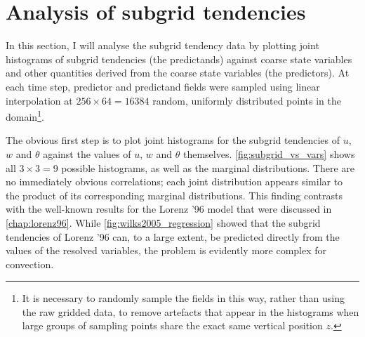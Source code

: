 \documentclass[../main.tex]{subfiles}
\begin{document}
\section{Analysis of subgrid tendencies} \label{sec:subgrid_analysis}
In this section, I will analyse the subgrid tendency data by plotting joint
histograms of subgrid tendencies (the predictands) against coarse state
variables and other quantities derived from the coarse state variables (the
predictors). At each time step, predictor and predictand fields were sampled
using linear interpolation at $256 \times 64 = 16384$ random, uniformly
distributed points in the domain\footnote{It is necessary to randomly sample
the fields in this way, rather than using the raw gridded data, to remove
artefacts that appear in the histograms when large groups of sampling points
share the exact same vertical position $z$.}.

The obvious first step is to plot joint histograms for the subgrid tendencies
of $u$, $w$ and $\theta$ against the values of $u$, $w$ and $\theta$
themselves. \cref{fig:subgrid_vs_vars} shows all $3 \times 3 = 9$ possible
histograms, as well as the marginal distributions. There are no immediately
obvious correlations; each joint distribution appears similar to the product of
its corresponding marginal distributions. This finding contrasts with the
well-known results for the Lorenz '96 model that were discussed in
\cref{chap:lorenz96}. While \cref{fig:wilks2005_regression} showed that
the subgrid tendencies of Lorenz '96 can, to a large extent, be predicted
directly from the values of the resolved variables, the problem is evidently
more complex for \rb{} convection.
\end{document}
